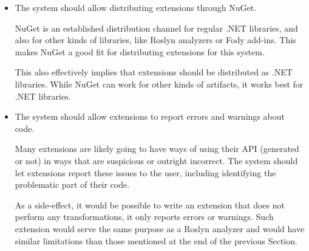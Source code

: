 \begin{itemize}
\item The system should allow distributing extensions through NuGet.

NuGet is an established distribution channel for regular .NET libraries, and also for other kinds of libraries, like Roslyn analyzers or Fody add-ins. This makes NuGet a good fit for distributing extensions for this system.

\label{extensions-are-dotnet-libraries}

This also effectively implies that extensions should be distributed as .NET libraries. While NuGet can work for other kinds of artifacts, it works best for .NET libraries.

\item The system should allow extensions to report errors and warnings about code.

Many extensions are likely going to have ways of using their \ac{API} (generated or not) in ways that are suspicious or outright incorrect. The system should let extensions report these issues to the user, including identifying the problematic part of their code.

As a side-effect, it would be possible to write an extension that does not perform any transformations, it only reports errors or warnings. Such extension would serve the same purpose as a Roslyn analyzer and would have similar limitations than those mentioned at the end of the previous Section.



\end{itemize}